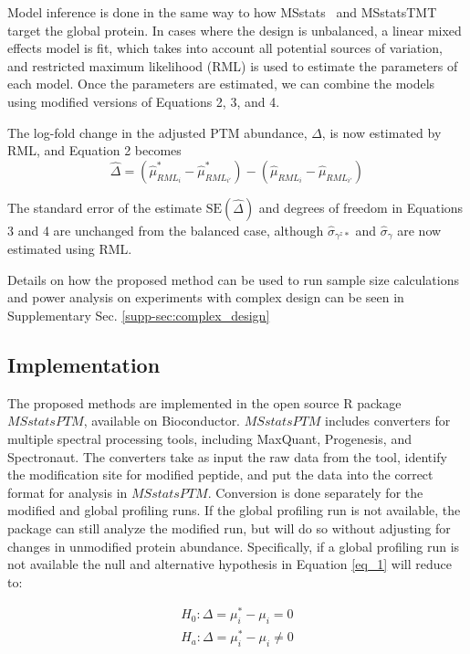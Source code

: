 \documentclass[mcp]{article}
\numberwithin{table}{section}
\begin{document}
Model inference is done in the same way to how MSstats~\cite{Choi:2014} and MSstatsTMT~\cite{Huang:2020} target the global protein. In cases where the design is unbalanced, a linear mixed effects model is fit, which takes into account all potential sources of variation, and restricted maximum likelihood (RML) is used to estimate the parameters of each model. Once the parameters are estimated, we can combine the models using modified versions of Equations 2, 3, and 4.

The log-fold change in the adjusted PTM abundance, $\Delta$, is now estimated by RML, and Equation 2 becomes 
\begin{equation}
\hat{\Delta} = (\hat{\mu}_{RML_i}^{\ast} - \hat{\mu}_{RML_{i'}}^{\ast}) - (\hat{\mu}_{RML_i} - \hat{\mu}_{RML_{i'}})
\end{equation}

The standard error of the estimate $\mathrm{SE}(\hat{\Delta})$ and degrees of freedom in Equations 3 and 4 are unchanged from the balanced case, although $\hat{\sigma}_{\gamma^z\ast}$ and $\hat{\sigma}_{\gamma}$ are now estimated using RML.

Details on how the proposed method can be used to run sample size calculations and power analysis on experiments with complex design can be seen in Supplementary Sec. \ref{supp-sec:complex_design}

\subsection*{Implementation}

The proposed methods are implemented in the open source R package $MSstatsPTM$, available on Bioconductor. $MSstatsPTM$ includes converters for multiple spectral processing tools, including MaxQuant, Progenesis, and Spectronaut. The converters take as input the raw data from the tool, identify the modification site for modified peptide, and put the data into the correct format for analysis in $MSstatsPTM$. Conversion is done separately for the modified and global profiling runs. If the global profiling run is not available, the package can still analyze the modified run, but will do so without adjusting for changes in unmodified protein abundance. Specifically, if a global profiling run is not available the null and alternative hypothesis in Equation \ref{eq_1} will reduce to:

\begin{equation}
\begin{aligned}
H_{0}: \Delta = \mu_{i}^{\ast} - \mu_{i} = 0 \\
H_{a}: \Delta = \mu_{i}^{\ast} - \mu_{i} \neq 0
\end{aligned}
\label{eq_9}
\end{equation}
\end{document}
